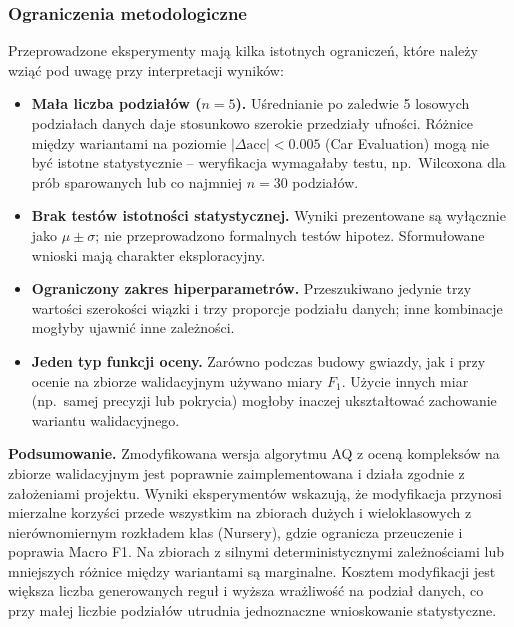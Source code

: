 \documentclass[12pt,a4paper]{article}
\begin{document}
\subsubsection*{Ograniczenia metodologiczne}

Przeprowadzone eksperymenty mają kilka istotnych ograniczeń, które należy
wziąć pod uwagę przy interpretacji wyników:

\begin{itemize}
  \item \textbf{Mała liczba podziałów ($n = 5$).} Uśrednianie po zaledwie 5
        losowych podziałach danych daje stosunkowo szerokie przedziały ufności.
        Różnice między wariantami na poziomie $|\Delta\text{acc}| < 0.005$
        (Car Evaluation) mogą nie być istotne statystycznie -- weryfikacja
        wymagałaby testu, np.\ Wilcoxona dla prób sparowanych lub co najmniej
        $n = 30$ podziałów.
  \item \textbf{Brak testów istotności statystycznej.} Wyniki prezentowane są
        wyłącznie jako $\mu \pm \sigma$; nie przeprowadzono formalnych testów
        hipotez. Sformułowane wnioski mają charakter eksploracyjny.
  \item \textbf{Ograniczony zakres hiperparametrów.} Przeszukiwano jedynie
        trzy wartości szerokości wiązki i trzy proporcje podziału danych;
        inne kombinacje mogłyby ujawnić inne zależności.
  \item \textbf{Jeden typ funkcji oceny.} Zarówno podczas budowy gwiazdy,
        jak i przy ocenie na zbiorze walidacyjnym używano miary $F_1$.
        Użycie innych miar (np.\ samej precyzji lub pokrycia) mogłoby
        inaczej ukształtować zachowanie wariantu walidacyjnego.
\end{itemize}

\medskip
\noindent\textbf{Podsumowanie.}
Zmodyfikowana wersja algorytmu AQ z oceną kompleksów na zbiorze walidacyjnym
jest poprawnie zaimplementowana i działa zgodnie z założeniami projektu.
Wyniki eksperymentów wskazują, że modyfikacja przynosi mierzalne korzyści
przede wszystkim na zbiorach dużych i wieloklasowych z nierównomiernym rozkładem klas
(Nursery), gdzie ogranicza przeuczenie i poprawia Macro F1.
Na zbiorach z silnymi deterministycznymi zależnościami lub mniejszych
różnice między wariantami są marginalne.
Kosztem modyfikacji jest większa liczba generowanych reguł i wyższa wrażliwość
na podział danych, co przy małej liczbie podziałów utrudnia jednoznaczne
wnioskowanie statystyczne.
\end{document}
